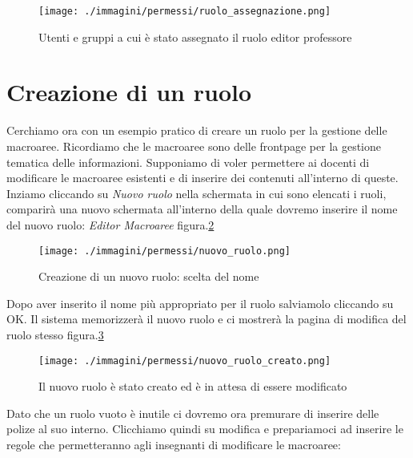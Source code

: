 \begin{figure}[H]
 \centering
 \texttt{[image: ./immagini/permessi/ruolo\_assegnazione.png]}
 \caption{Utenti e gruppi a cui è stato assegnato il ruolo editor professore}
 \label{fig:perm_assegnazione}
\end{figure}




\section{Creazione di un ruolo}

Cerchiamo ora con un esempio pratico di creare un ruolo per la gestione delle macroaree. Ricordiamo che le macroaree sono delle frontpage per la gestione tematica delle informazioni.
Supponiamo di voler permettere ai docenti di modificare le macroaree esistenti e di inserire dei contenuti all'interno di queste.
Inziamo cliccando su \textsl{Nuovo ruolo} nella schermata in cui sono elencati i ruoli, comparirà una nuovo schermata all'interno della quale dovremo inserire il nome del nuovo ruolo: \emph{Editor Macroaree} figura.\ref{fig:perm_macro}
\begin{figure}[H]
 \centering
 \texttt{[image: ./immagini/permessi/nuovo\_ruolo.png]}
 \caption{Creazione di un nuovo ruolo: scelta del nome}
 \label{fig:perm_macro}
\end{figure}
 
Dopo aver inserito il nome più appropriato per il ruolo salviamolo cliccando su OK. Il sistema memorizzerà il nuovo ruolo e ci mostrerà la pagina di modifica del ruolo stesso figura.\ref{fig:perm_mod_ruolo}
\begin{figure}[H]
 \centering
 \texttt{[image: ./immagini/permessi/nuovo\_ruolo\_creato.png]}
 \caption{Il nuovo ruolo è stato creato ed è in attesa di essere modificato}
 \label{fig:perm_mod_ruolo}
\end{figure}
Dato che un ruolo vuoto è inutile ci dovremo ora premurare di inserire delle polize al suo interno. Clicchiamo quindi su modifica e prepariamoci ad inserire le regole che permetteranno agli insegnanti di modificare le macroaree:



